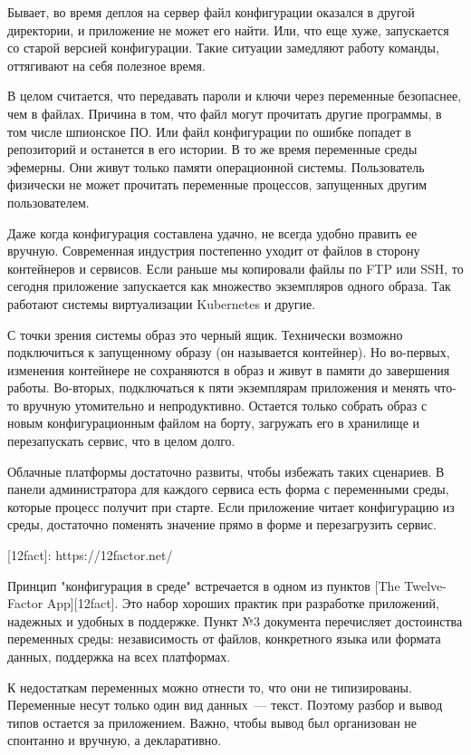 Бывает, во время деплоя на сервер файл конфигурации оказался в другой
директории, и приложение не может его найти. Или, что еще хуже, запускается со
старой версией конфигурации. Такие ситуации замедляют работу команды, оттягивают
на себя полезное время.

В целом считается, что передавать пароли и ключи через переменные безопаснее,
чем в файлах. Причина в том, что файл могут прочитать другие программы, в том
числе шпионское ПО. Или файл конфигурации по ошибке попадет в репозиторий и
останется в его истории. В то же время переменные среды эфемерны. Они живут
только памяти операционной системы. Пользователь физически не может прочитать
переменные процессов, запущенных другим пользователем.

Даже когда конфигурация составлена удачно, не всегда удобно править ее
вручную. Современная индустрия постепенно уходит от файлов в сторону контейнеров
и сервисов. Если раньше мы копировали файлы по FTP или SSH, то сегодня
приложение запускается как множество экземпляров одного образа. Так работают
системы виртуализации Kubernetes и другие.

С точки зрения системы образ это черный ящик. Технически возможно подключиться к
запущенному образу (он называется контейнер). Но во-первых, изменения контейнере
не сохраняются в образ и живут в памяти до завершения работы. Во-вторых,
подключаться к пяти экземплярам приложения и менять что-то вручную утомительно и
непродуктивно. Остается только собрать образ с новым конфигурационным файлом на
борту, загружать его в хранилище и перезапускать сервис, что в целом долго.

Облачные платформы достаточно развиты, чтобы избежать таких сценариев. В панели
администратора для каждого сервиса есть форма с переменными среды, которые
процесс получит при старте. Если приложение читает конфигурацию из среды,
достаточно поменять значение прямо в форме и перезагрузить сервис.

[12fact]: https://12factor.net/

Принцип "конфигурация в среде" встречается в одном из пунктов [The Twelve-Factor
App][12fact]. Это набор хороших практик при разработке приложений, надежных и
удобных в поддержке. Пункт №3 документа перечисляет достоинства переменных
среды: независимость от файлов, конкретного языка или формата данных, поддержка
на всех платформах.

К недостаткам переменных можно отнести то, что они не типизированы. Переменные
несут только один вид данных~--- текст. Поэтому разбор и вывод типов остается за
приложением. Важно, чтобы вывод был организован не спонтанно и вручную, а
декларативно.

